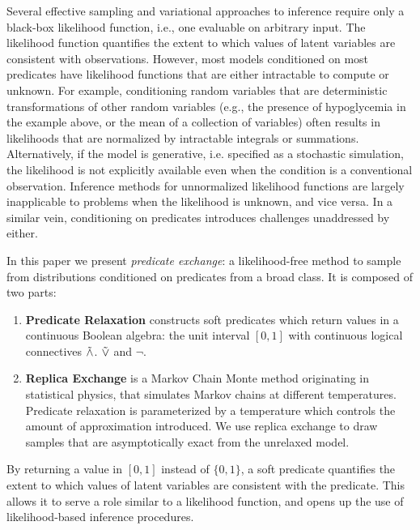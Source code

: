 Several effective sampling  \citep{andrieu2003introduction} and variational  \citep{jordan1999introduction, ranganath2014black} approaches to inference require only a black-box likelihood function, i.e., one evaluable on arbitrary input.
The likelihood function quantifies the extent to which values of latent variables are consistent with observations. 
However, most models conditioned on most predicates have likelihood functions that are either intractable to compute or unknown.
For example, conditioning random variables that are deterministic transformations of other random variables (e.g., the presence of hypoglycemia in the example above, or the mean of a collection of variables) often results in likelihoods that are normalized by intractable integrals or summations.	
Alternatively, if the model is generative, i.e. specified as a stochastic simulation, the likelihood is not explicitly available even when the condition is a conventional observation.
Inference methods for unnormalized likelihood functions are largely inapplicable to problems when the likelihood is unknown, and vice versa.
In a similar vein, conditioning on predicates introduces challenges unaddressed by either.

In this paper we present \emph{predicate exchange}:
a likelihood-free method to sample from distributions conditioned on predicates from a broad class.
It is composed of two parts:
\begin{enumerate}
\item \textbf{Predicate Relaxation} constructs soft predicates which return values in a continuous Boolean algebra: the unit interval $[0, 1]$ with continuous logical connectives $\mathrel{\tilde{\land}}$. $\mathrel{\tilde{\lor}}$ and $\neg$.
\item  \textbf{Replica Exchange} is a Markov Chain Monte method originating in statistical physics, that simulates Markov chains at different temperatures.  Predicate relaxation is parameterized by a temperature which controls the amount of approximation introduced.  We use replica exchange to draw samples that are asymptotically exact from the unrelaxed model. 
\end{enumerate}

By returning a value in $[0, 1]$ instead of $\{0, 1\}$, a soft predicate quantifies the extent to which values of latent variables are consistent with the predicate.
This allows it to serve a role similar to a likelihood function, and opens up the use of likelihood-based inference procedures.

